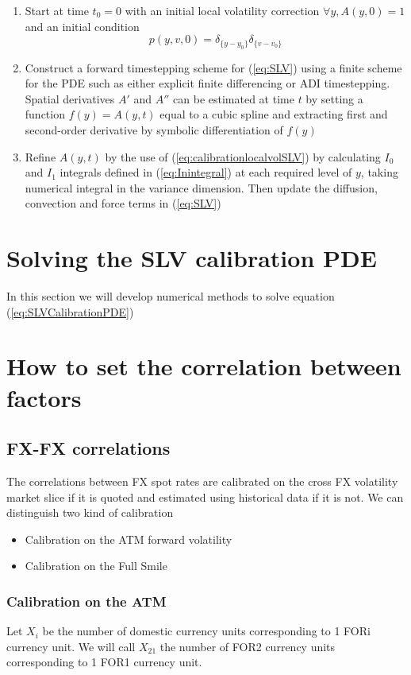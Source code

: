 \documentclass{article}
\begin{document}
\begin{enumerate}
	\item Start at time $t_0 = 0$ with an initial local volatility correction $\forall y, A(y,0) = 1$ and an initial condition
\begin{equation}
	p(y,v,0) = \delta_{\{y-y_0\}} \delta_{\{v-v_0\}}
\end{equation}
	\item Construct a forward timestepping scheme for (\ref{eq:SLV}) using a finite scheme for the PDE such as either explicit finite differencing or ADI timestepping. Spatial derivatives $A'$ and $A''$ can be estimated at time $t$ by setting a function $f(y) = A(y,t)$ equal to a cubic spline and extracting first and second-order derivative by symbolic differentiation of $f(y)$
	\item Refine $A(y,t)$ by the use of (\ref{eq:calibrationlocalvolSLV}) by calculating $I_0$ and $I_1$ integrals defined in (\ref{eq:Inintegral}) at each required level of $y$, taking numerical integral in the variance dimension. Then update the diffusion, convection and force terms in (\ref{eq:SLV})
\end{enumerate}
\section{Solving the SLV calibration PDE}
In this section we will develop numerical methods to solve equation (\ref{eq:SLVCalibrationPDE})

\section{How to set the correlation between factors}

\subsection{FX-FX correlations}
The correlations between FX spot rates are calibrated on the cross FX volatility market slice if it is quoted and estimated using historical data if it is not. We can distinguish two kind of calibration

\begin{itemize}
	\item Calibration on the ATM forward volatility
	\item Calibration on the Full Smile
\end{itemize}

\subsubsection{Calibration on the ATM}
Let $X_i$ be the number of domestic currency units corresponding to 1 FORi currency unit. We will call $X_{21}$ the number of FOR2 currency units corresponding to 1 FOR1 currency unit.
\end{document}
